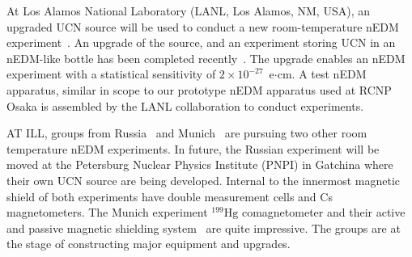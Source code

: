 
At Los Alamos National Laboratory (LANL, Los Alamos, NM, USA), an upgraded UCN source will be used to conduct a new room-temperature nEDM experiment~\cite{lanl_nEDM-workshop}. An upgrade of the source, and an experiment storing UCN in an nEDM-like bottle has been completed recently~\cite{sns_nEDM-workshop2,sns2}. The upgrade enables an nEDM experiment with a statistical sensitivity of $2\times10^{-27}$~e$\cdot$cm. A test nEDM apparatus, similar in scope to our prototype nEDM apparatus used at RCNP Osaka is assembled by the LANL collaboration to conduct experiments.





AT ILL, groups from Russia~\cite{pnpi_nEDM-workshop} and Munich~\cite{ill2_nEDM-workshop} are pursuing two other room temperature nEDM experiments. In future, the Russian experiment will be moved at the Petersburg Nuclear Physics Institute (PNPI) in Gatchina where their own UCN source are being developed. Internal to the innermost magnetic shield of both experiments have double measurement cells and Cs magnetometers. The Munich experiment $^{199}\mathrm{Hg}$ comagnetometer and their active and passive magnetic shielding system~\cite{msr_design,shield_pnpi,shield_pnpi2} are quite impressive. The groups are at the stage of constructing major equipment and upgrades.

